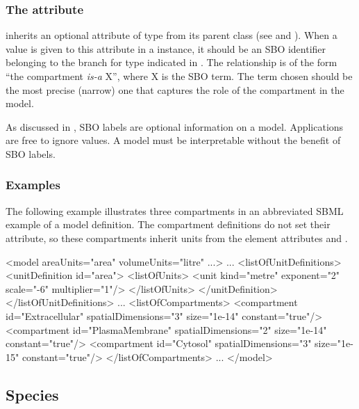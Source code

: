 \subsubsection{The  attribute}
\label{sec:compartment-sboterm}

\Compartment inherits an optional 
attribute of type  from its parent
class \SBase (see 
and ).  When a value is given to this
attribute in a \Compartment instance, it should be an
SBO identifier belonging to the branch for type \Compartment 
indicated in .  The relationship is
of the form ``the compartment  \emph{is-a} X'', where X is
the SBO term.  The term chosen should be the most precise (narrow)
one that captures the role of the compartment in the model.

As discussed in , SBO labels are optional
information on a model.  Applications are free to ignore
 values.  A model must be interpretable without the
benefit of SBO labels.


\subsubsection{Examples}

The following example illustrates three compartments in an
abbreviated SBML example of a model definition.  The compartment
definitions do not set their  attribute, so 
these compartments inherit units from the  element
attributes  and .

\begin{example}
<model areaUnits="area" volumeUnits="litre" ...>
    ...
    <listOfUnitDefinitions>
        <unitDefinition id="area">
            <listOfUnits>
                <unit kind="metre" exponent="2" scale="-6" multiplier="1"/>
            </listOfUnits>
        </unitDefinition>
    </listOfUnitDefinitions>
    ...
    <listOfCompartments>
        <compartment id="Extracellular"  spatialDimensions="3" size="1e-14" constant="true"/>
        <compartment id="PlasmaMembrane" spatialDimensions="2" size="1e-14" constant="true"/>
        <compartment id="Cytosol"        spatialDimensions="3" size="1e-15" constant="true"/>
    </listOfCompartments>
    ...
</model>
\end{example}


\subsection{Species}
\label{sec:species}

